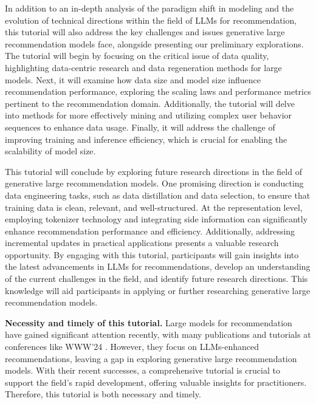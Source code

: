 In addition to an in-depth analysis of the paradigm shift in modeling and the evolution of technical directions within the field of LLMs for  recommendation, this tutorial will also address the key challenges and issues generative large recommendation models face, alongside presenting our preliminary explorations. The tutorial will begin by focusing on the critical issue of data quality, highlighting data-centric research and data regeneration methods for large models. Next, it will examine how data size and model size influence recommendation performance, exploring the scaling laws and performance metrics pertinent to the recommendation domain. Additionally, the tutorial will delve into methods for more effectively mining and utilizing complex user behavior sequences to enhance data usage. Finally, it will address the challenge of improving training and inference efficiency, which is crucial for enabling the scalability of model size.

This tutorial will conclude by exploring future research directions in the field of generative large recommendation models. One promising direction is conducting data engineering tasks, such as data distillation and data selection, to ensure that training data is clean, relevant, and well-structured. At the representation level, employing tokenizer technology and integrating side information can significantly enhance recommendation performance and efficiency. Additionally, addressing incremental updates in practical applications presents a valuable research opportunity. By engaging with this tutorial, participants will gain insights into the latest advancements in LLMs for recommendations, develop an understanding of the current challenges in the field, and identify future research directions. This knowledge will aid participants in applying or further researching generative large recommendation models.

\textbf{Necessity and timely of this tutorial.}  Large models for recommendation have gained significant attention recently, with many publications and tutorials at conferences like WWW'24 \cite{zhang2024large}. However, they focus on LLMs-enhanced recommendations, leaving a gap in exploring generative large recommendation models. With their recent successes, a comprehensive tutorial is crucial to support the field's rapid development, offering valuable insights for practitioners. Therefore, this tutorial is both necessary and timely.